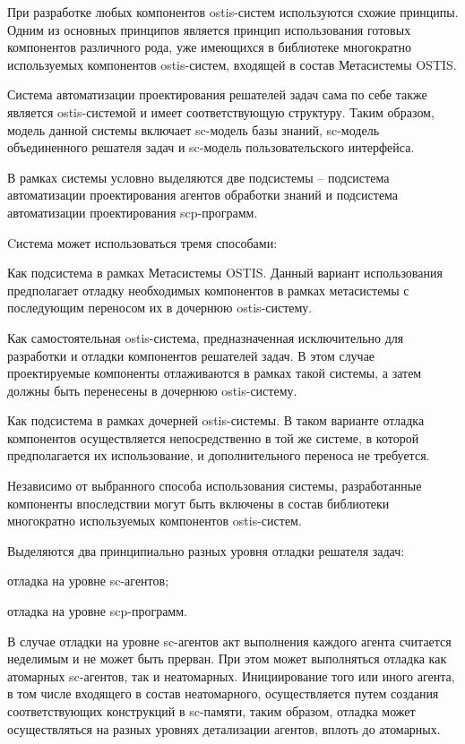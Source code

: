 При разработке любых компонентов ostis-систем используются схожие принципы. Одним из основных принципов является принцип использования готовых компонентов различного рода, уже имеющихся в библиотеке многократно используемых компонентов ostis-систем, входящей в состав Метасистемы OSTIS.

Система автоматизации проектирования решателей задач сама по себе также является ostis-системой и имеет соответствующую структуру. Таким образом, модель данной системы включает sc-модель базы знаний, sc-модель объединенного решателя задач и sc-модель пользовательского интерфейса.

В рамках системы условно выделяются две подсистемы -- подсистема автоматизации проектирования агентов обработки знаний и подсистема автоматизации проектирования scp-программ.

Cистема может использоваться тремя способами:
\begin{textitemize}
    \item Как подсистема в рамках Метасистемы OSTIS. Данный вариант использования предполагает отладку необходимых компонентов в рамках метасистемы с последующим переносом их в дочернюю ostis-систему.
    \item Как самостоятельная ostis-система, предназначенная исключительно для разработки и отладки компонентов решателей задач. В этом случае проектируемые компоненты отлаживаются в рамках такой системы, а затем должны быть перенесены в дочернюю ostis-систему.
    \item Как подсистема в рамках дочерней ostis-системы. В таком варианте отладка компонентов осуществляется непосредственно в той же системе, в которой предполагается их использование, и дополнительного переноса не требуется.
\end{textitemize}

Независимо от выбранного способа использования системы, разработанные компоненты впоследствии могут быть включены в состав библиотеки многократно используемых компонентов ostis-систем.

Выделяются два принципиально разных уровня отладки решателя задач:
\begin{textitemize}
    \item отладка на уровне sc-агентов;
    \item отладка на уровне scp-программ.
\end{textitemize}

В случае отладки на уровне sc-агентов акт выполнения каждого агента считается неделимым и не может быть прерван. При этом может выполняться отладка как атомарных sc-агентов, так и неатомарных. Инициирование того или иного агента, в том числе входящего в состав неатомарного, осуществляется путем создания соответствующих конструкций в sc-памяти, таким образом, отладка может осуществляться на разных уровнях детализации агентов, вплоть до атомарных.

